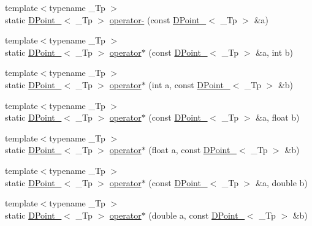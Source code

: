 \begin{DoxyCompactItemize}
\item 
{\footnotesize template$<$typename \-\_\-\-Tp $>$ }\\static \hyperlink{classnubot_1_1DPoint__}{D\-Point\-\_\-}$<$ \-\_\-\-Tp $>$ \hyperlink{namespacenubot_a14de3c0253b772c1e9ad60636de13166}{operator-\/} (const \hyperlink{classnubot_1_1DPoint__}{D\-Point\-\_\-}$<$ \-\_\-\-Tp $>$ \&a)
\item 
{\footnotesize template$<$typename \-\_\-\-Tp $>$ }\\static \hyperlink{classnubot_1_1DPoint__}{D\-Point\-\_\-}$<$ \-\_\-\-Tp $>$ \hyperlink{namespacenubot_a4ea1555b4c9a7d09b8a93f9225e6e8e4}{operator$\ast$} (const \hyperlink{classnubot_1_1DPoint__}{D\-Point\-\_\-}$<$ \-\_\-\-Tp $>$ \&a, int b)
\item 
{\footnotesize template$<$typename \-\_\-\-Tp $>$ }\\static \hyperlink{classnubot_1_1DPoint__}{D\-Point\-\_\-}$<$ \-\_\-\-Tp $>$ \hyperlink{namespacenubot_a64a279fb92906e412ad4ca293573bb7b}{operator$\ast$} (int a, const \hyperlink{classnubot_1_1DPoint__}{D\-Point\-\_\-}$<$ \-\_\-\-Tp $>$ \&b)
\item 
{\footnotesize template$<$typename \-\_\-\-Tp $>$ }\\static \hyperlink{classnubot_1_1DPoint__}{D\-Point\-\_\-}$<$ \-\_\-\-Tp $>$ \hyperlink{namespacenubot_abc957b6da745b25497bca54d774dc2fb}{operator$\ast$} (const \hyperlink{classnubot_1_1DPoint__}{D\-Point\-\_\-}$<$ \-\_\-\-Tp $>$ \&a, float b)
\item 
{\footnotesize template$<$typename \-\_\-\-Tp $>$ }\\static \hyperlink{classnubot_1_1DPoint__}{D\-Point\-\_\-}$<$ \-\_\-\-Tp $>$ \hyperlink{namespacenubot_ad7c107404cae1f8d86d8dfd8892ec282}{operator$\ast$} (float a, const \hyperlink{classnubot_1_1DPoint__}{D\-Point\-\_\-}$<$ \-\_\-\-Tp $>$ \&b)
\item 
{\footnotesize template$<$typename \-\_\-\-Tp $>$ }\\static \hyperlink{classnubot_1_1DPoint__}{D\-Point\-\_\-}$<$ \-\_\-\-Tp $>$ \hyperlink{namespacenubot_a5790832e928725a31d8d62a1f3ee1128}{operator$\ast$} (const \hyperlink{classnubot_1_1DPoint__}{D\-Point\-\_\-}$<$ \-\_\-\-Tp $>$ \&a, double b)
\item 
{\footnotesize template$<$typename \-\_\-\-Tp $>$ }\\static \hyperlink{classnubot_1_1DPoint__}{D\-Point\-\_\-}$<$ \-\_\-\-Tp $>$ \hyperlink{namespacenubot_ae3cf1882cb11f60aa153f8c6097ab971}{operator$\ast$} (double a, const \hyperlink{classnubot_1_1DPoint__}{D\-Point\-\_\-}$<$ \-\_\-\-Tp $>$ \&b)

\end{DoxyCompactItemize}
